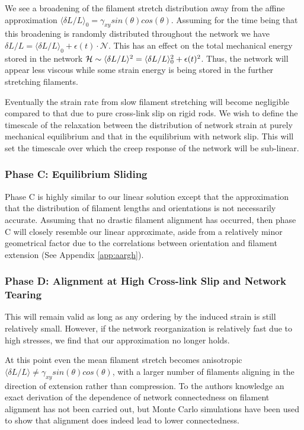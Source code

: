 \documentclass[pre,reprint]{revtex4-1}
\begin{document}
We see a broadening of the filament stretch distribution away from the affine approximation $\langle \delta L/L\rangle_0 = \gamma_{xy}sin(\theta)cos(\theta)$.  Assuming for the time being that this broadening is randomly distributed throughout the network we have $\delta L/L = \langle \delta L/L\rangle_0 + \epsilon(t)\cdot\mathcal{N}$.  This has an effect on the total mechanical energy stored in the network ${\cal H} \sim  \langle\delta L/L\rangle^2 = \langle\delta L/L\rangle_0^2 +\epsilon(t)^2 $.  Thus, the network will appear less viscous while some strain energy is being stored in the further stretching filaments.  

Eventually the strain rate from slow filament stretching will become negligible compared to that due to pure cross-link slip on rigid rods.  We wish to define the timescale of the relaxation between the distribution of network strain at purely mechanical equilibrium and that in the equilibrium with network slip.  This will set the timescale over which the creep response of the network will be sub-linear.



\subsubsection{Phase C: Equilibrium Sliding}

Phase C is highly similar to our linear solution except that the approximation that the distribution of filament lengths and orientations is not necessarily accurate.
Assuming that no drastic filament alignment has occurred, then phase C will closely resemble our linear approximate, aside from a relatively minor geometrical factor due to the correlations between orientation and filament extension (See Appendix \ref{app:aargh}).


\subsubsection{Phase D: Alignment at High Cross-link Slip and Network Tearing}


This will remain valid as long as any ordering by the induced strain is still relatively small.  However, if the network reorganization is relatively fast due to high stresses, we find that our approximation no longer holds.  

At this point even the mean filament stretch becomes anisotropic $\langle \delta L / L \rangle \neq \gamma_{xy}sin(\theta)cos(\theta)$, with a larger number of filaments aligning in the direction of extension rather than compression.  To the authors knowledge an exact derivation of the dependence of network connectedness on filament alignment has not been carried out, but Monte Carlo simulations have been used to show that alignment does indeed lead to lower connectedness\cite{model_percolationanisotropy}.
\end{document}
